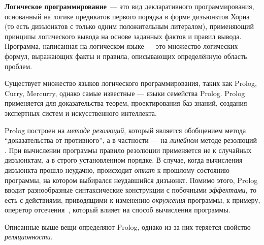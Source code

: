 {\bf Логическое программирование}~--- это вид декларативного программирования,
основанный на логике предикатов первого порядка в форме дизъюнктов Хорна (то есть дизъюнктов
с только одним положительным литералом),
применяющий принципы логического вывода на основе заданных фактов и правил вывода.
Программа, написанная на логическом языке --- это множество логических формул,
выражающих факты и правила, описывающих определённую область проблем.\cite{logicMJ}

Существует множество языков логического программирования, таких как Prolog, Curry, Mercurry,
однако самые известные --- языки семейства Prolog. Prolog применяется для доказательства
теорем, проектирования баз знаний, создания экспертных систем и искусственного интеллекта.

Prolog построен на \emph{методе резолюций}, который является обобщением метода
``доказательства от противного'', а в частности --- на \emph{линейном} методе
резолюций .
При вычислении программы правило резолюции применяется не к случайных дизъюнктам,
а в строго установленном порядке. В случае, когда вычисления дизъюнкта прошло
неудачно, происходит \emph{откат} к прошлому состоянию программы, на котором
выбирался неудавшийся дизъюнкт\cite{logicMJ}.
Помимо этого, Prolog вводит разнообразные синтаксические конструкции с побочными \emph{эффектами},
то есть с действиями, приводящими к изменению \emph{окружения} программы,
к примеру, оперетор отсечения~,
который влияет на способ вычисления программы.

Описанные выше вещи определяют Prolog, однако из-за них теряется свойство \emph{реляционности}.

% 
% 
% 
